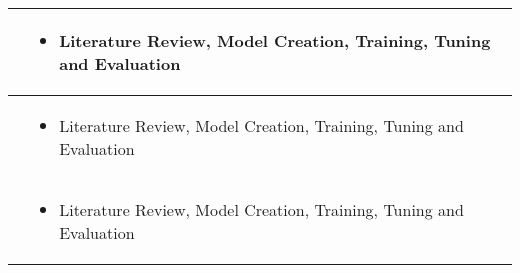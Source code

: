 \begin{longtable}{p{5cm}|p{9.5cm}}
    \nameref{ss:lhsj} &
        \begin{itemize}
            \item \nameref{s:vit} Literature Review, Model Creation, Training, Tuning and Evaluation
        \end{itemize}\\
        \hline
    
    \nameref{ss:ozxm} &
        \begin{itemize}
            \item \nameref{s:xception} Literature Review, Model Creation, Training, Tuning and Evaluation
        \end{itemize}\\
        \hline
    
    \nameref{ss:ctsh} &
        \begin{itemize}
            \item \nameref{s:densenet121} Literature Review, Model Creation, Training, Tuning and Evaluation
        \end{itemize}\\
    \hline
\end{longtable}
